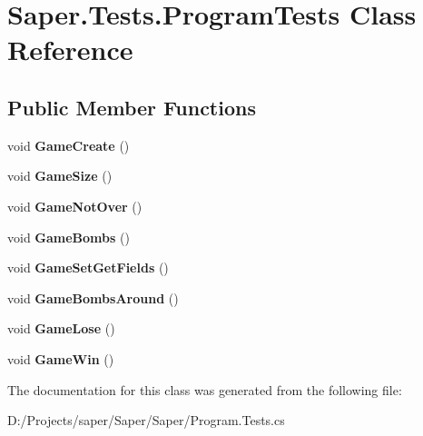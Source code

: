 \hypertarget{class_saper_1_1_tests_1_1_program_tests}{}\section{Saper.\+Tests.\+Program\+Tests Class Reference}
\label{class_saper_1_1_tests_1_1_program_tests}
\subsection*{Public Member Functions}
\begin{DoxyCompactItemize}
\item 
\mbox{\label{class_saper_1_1_tests_1_1_program_tests_a9774585fffb849f9c8b33c6e351748d8}} 
void {\bfseries Game\+Create} ()
\item 
\mbox{\label{class_saper_1_1_tests_1_1_program_tests_afef65abd57fa4fd8ef39967855e4c1b2}} 
void {\bfseries Game\+Size} ()
\item 
\mbox{\label{class_saper_1_1_tests_1_1_program_tests_a21d337cc8f3c53f0296a8853c2783818}} 
void {\bfseries Game\+Not\+Over} ()
\item 
\mbox{\label{class_saper_1_1_tests_1_1_program_tests_ad11f91c967457113e7ee5f43c4ff54a1}} 
void {\bfseries Game\+Bombs} ()
\item 
\mbox{\label{class_saper_1_1_tests_1_1_program_tests_afbf5122edc7a9945db74f8ecad4cae41}} 
void {\bfseries Game\+Set\+Get\+Fields} ()
\item 
\mbox{\label{class_saper_1_1_tests_1_1_program_tests_a5385fbe423cd40ca4674ddc0060a2752}} 
void {\bfseries Game\+Bombs\+Around} ()
\item 
\mbox{\label{class_saper_1_1_tests_1_1_program_tests_a8a3221efdf3b62166f012dcf7e1ce68c}} 
void {\bfseries Game\+Lose} ()
\item 
\mbox{\label{class_saper_1_1_tests_1_1_program_tests_a9a2abea95633c70b2845c44e017399cb}} 
void {\bfseries Game\+Win} ()
\end{DoxyCompactItemize}


The documentation for this class was generated from the following file\+:\begin{DoxyCompactItemize}
\item 
D\+:/\+Projects/saper/\+Saper/\+Saper/Program.\+Tests.\+cs\end{DoxyCompactItemize}
